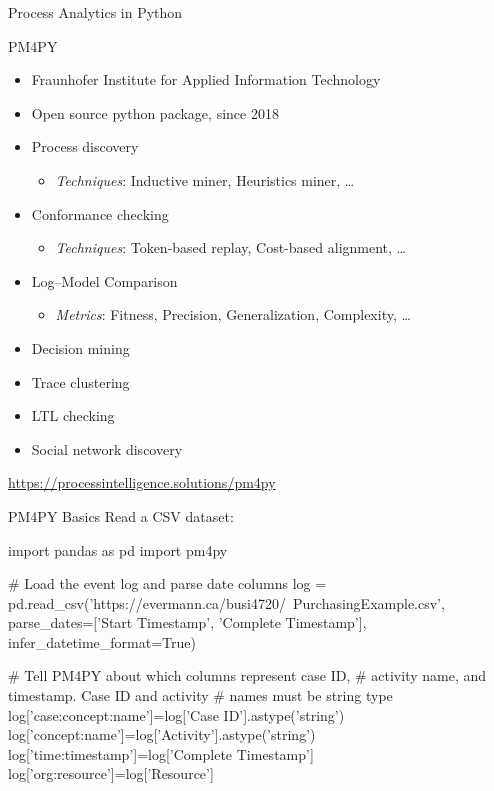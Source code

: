 \documentclass[ignorenonframetext,xcolor=x11names]{beamer}
\begin{document}
\begin{frame}{Process Analytics in Python}
\begin{block}{PM4PY}
\begin{itemize}
   \item Fraunhofer Institute for Applied Information Technology
   \item Open source python package, since 2018
   \item Process discovery
   \begin{itemize}
       \item \emph{Techniques}: Inductive miner, Heuristics miner, \ldots
   \end{itemize}
   \item Conformance checking
   \begin{itemize}
       \item \emph{Techniques}: Token-based replay, Cost-based alignment, \ldots
   \end{itemize}
   \item Log--Model Comparison
   \begin{itemize}
       \item \emph{Metrics}: Fitness, Precision, Generalization, Complexity, \ldots
   \end{itemize}
   \item Decision mining
   \item Trace clustering
   \item LTL checking
   \item Social network discovery
\end{itemize}
\end{block}
\vspace{.5\baselineskip}
\url{https://processintelligence.solutions/pm4py}

\end{frame}

\begin{frame}[fragile]{PM4PY Basics}
Read a CSV dataset:
\footnotesize
\begin{pythoncode}
import pandas as pd
import pm4py

# Load the event log and parse date columns
log = pd.read_csv('https://evermann.ca/busi4720/\
   PurchasingExample.csv', 
   parse_dates=['Start Timestamp', 'Complete Timestamp'], 
   infer_datetime_format=True)

# Tell PM4PY about which columns represent case ID,
# activity name, and timestamp. Case ID and activity
# names must be string type
log['case:concept:name']=log['Case ID'].astype('string')
log['concept:name']=log['Activity'].astype('string')
log['time:timestamp']=log['Complete Timestamp']
log['org:resource']=log['Resource']
\end{pythoncode}

\end{frame}
\end{document}
